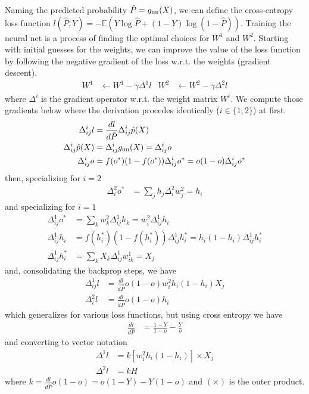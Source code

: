 \documentclass{article}
\begin{document}
Naming the predicted probability $\hat{P} = g_{\mathrm{nn}}(X)$, we can define
the cross-entropy loss function $l(\hat{P}, Y) = -\mathbb{E}(Y
\log\hat{P} + (1-Y)\log(1-\hat{P}))$. Training the neural net is a
process of finding the optimal choices for $W^1$ and $W^2$. Starting
with initial guesses for the weights, we can improve the value of the
loss function by following the negative gradient of the loss
w.r.t. the weights (gradient descent).
\begin{align}
  W^1& \leftarrow W^1 - \gamma \Delta^1 l &
  W^2& \leftarrow W^2 - \gamma \Delta^2 l
\end{align}
where $\Delta^i$ is the gradient operator w.r.t. the weight matrix
$W^i$. We compute those gradients below where the derivation procedes
identically ($i \in \{1, 2\}$) at first.
\begin{align}
  \Delta^i_{ij} l &= \frac{d l}{d \hat{P}} \Delta^i_{ij} \hat{p}(X) \\
  \Delta^i_{ij} \hat{p}(X) &= \Delta^i_{ij} g_{\mathrm{nn}}(X) = \Delta^i_{ij} o \\
  \Delta^i_{ij} o &= f(o^*)(1-f(o^*)) \Delta^i_{ij} o^* = o(1-o) \Delta^i_{ij} o^*
\end{align}
then, specializing for $i = 2$
\begin{align}
  \Delta^2_{i} o^* &= \sum_j h_j \Delta^2_{i} w^2_j = h_i
\end{align}
and specializing for $i = 1$
\begin{align}
  \Delta^1_{ij} o^* &= \sum_k w^2_k \Delta^1_{ij} h_k = w^2_i \Delta^1_{ij} h_i \\
  \Delta^1_{ij} h_i &= f(h_i^*)(1-f(h_i^*)) \Delta^1_{ij} h_i^* = h_i(1-h_i) \Delta^1_{ij} h_i^* \\
  \Delta^1_{ij} h_i^* &= \sum_k X_k \Delta^1_{ij} w^1_{ik} = X_j
\end{align}
and, consolidating the backprop steps, we have
\begin{align}
  \Delta^1_{ij} l &= \frac{d l}{d \hat{P}} o(1-o) w^2_i h_i(1-h_i) X_j \\
  \Delta^2_{i} l &= \frac{d l}{d \hat{P}} o(1-o) h_i
\end{align}
which generalizes for various loss functions, but using cross entropy
we have 
\begin{align}
  \frac{d l}{d \hat{P}} &= \frac{1 - Y}{1 - o} -
  \frac{Y}{o}
\end{align}
and converting to vector notation
\begin{align}
  \Delta^1 l &= k [w^2_i h_i(1-h_i)] \times X_j \\
  \Delta^2 l &= k H
\end{align}
where $k = \frac{d l}{d \hat{P}} o(1-o) = o(1 - Y) - Y(1-o)$ and
$(\times)$ is the outer product.
\end{document}
